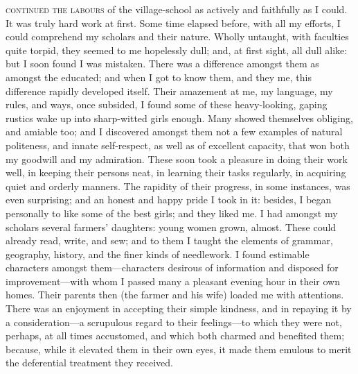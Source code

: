 
 \textsc{continued the labours} of the village-school as actively and faithfully
as I could. It was truly hard work at first. Some time elapsed before,
with all my efforts, I could comprehend my scholars and their nature. 
Wholly untaught, with faculties quite torpid, they seemed to me
hopelessly dull; and, at first sight, all dull alike: but I soon found I
was mistaken. There was a difference amongst them as amongst the
educated; and when I got to know them, and they me, this difference
rapidly developed itself. Their amazement at me, my language, my rules,
and ways, once subsided, I found some of these heavy-looking, gaping
rustics wake up into sharp-witted girls enough. Many showed themselves
obliging, and amiable too; and I discovered amongst them not a few
examples of natural politeness, and innate self-respect, as well as of
excellent capacity, that won both my goodwill and my admiration. These
soon took a pleasure in doing their work well, in keeping their persons
neat, in learning their tasks regularly, in acquiring quiet and orderly
manners. The rapidity of their progress, in some instances, was even
surprising; and an honest and happy pride I took in it: besides, I began
personally to like some of the best girls; and they liked me. I had
amongst my scholars several farmers' daughters: young women grown,
almost. These could already read, write, and sew; and to them I taught
the elements of grammar, geography, history, and the finer kinds of
needlework. I found estimable characters amongst them---characters
desirous of information and disposed for improvement---with whom I
passed many a pleasant evening hour in their own homes. Their parents
then (the farmer and his wife) loaded me with attentions. There was an
enjoyment in accepting their simple kindness, and in repaying it by a
consideration---a scrupulous regard to their feelings---to which they
were not, perhaps, at all times accustomed, and which both charmed and
benefited them; because, while it elevated them in their own eyes, it
made them emulous to merit the deferential treatment they received.

